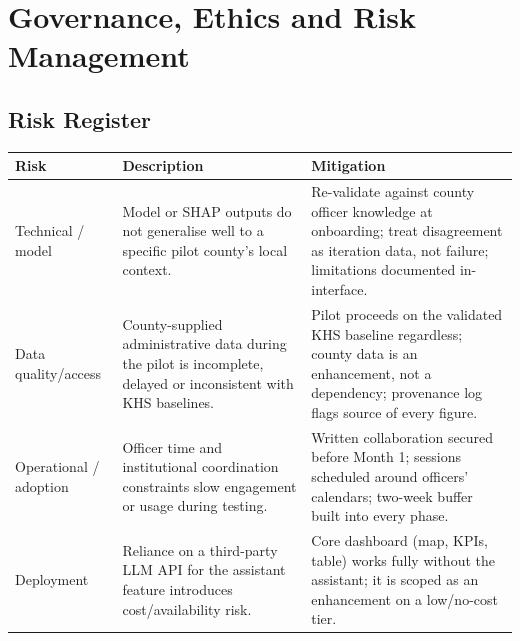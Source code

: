 \documentclass[12pt,a4paper]{article}
\begin{document}
\newpage
\section{Governance, Ethics and Risk Management}

\subsection{Risk Register}
\begin{center}
\small
\begin{tabular}{@{}p{2.1cm}p{6.4cm}p{6.0cm}@{}}
\toprule
\textbf{Risk} & \textbf{Description} & \textbf{Mitigation} \\
\midrule
Technical / model &
Model or SHAP outputs do not generalise well to a specific pilot county's local context. &
Re-validate against county officer knowledge at onboarding; treat disagreement as iteration data, not failure; limitations documented in-interface. \\
\addlinespace
Data quality/access &
County-supplied administrative data during the pilot is incomplete, delayed or inconsistent with KHS baselines. &
Pilot proceeds on the validated KHS baseline regardless; county data is an enhancement, not a dependency; provenance log flags source of every figure. \\
\addlinespace
Operational / adoption &
Officer time and institutional coordination constraints slow engagement or usage during testing. &
Written collaboration secured before Month 1; sessions scheduled around officers' calendars; two-week buffer built into every phase. \\
\addlinespace
Deployment &
Reliance on a third-party LLM API for the assistant feature introduces cost/availability risk. &
Core dashboard (map, KPIs, table) works fully without the assistant; it is scoped as an enhancement on a low/no-cost tier. \\
\bottomrule
\end{tabular}
\end{center}
\end{document}
